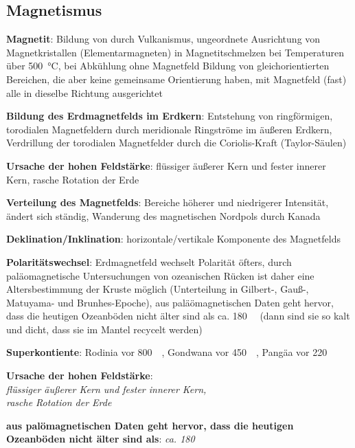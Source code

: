 \subsection{%
    Magnetismus%
}

\textbf{Magnetit}:
Bildung von  durch Vulkanismus,
ungeordnete Ausrichtung von Magnetkristallen (Elementarmagneten) in Magnetitschmelzen bei
Temperaturen über \SI{500}{\celsius},
bei Abkühlung ohne Magnetfeld Bildung von gleichorientierten Bereichen, die aber keine
gemeinsame Orientierung haben,
mit Magnetfeld (fast) alle in dieselbe Richtung ausgerichtet

\textbf{Bildung des Erdmagnetfelds im Erdkern}:
Entstehung von ringförmigen, torodialen Magnetfeldern durch meridionale Ringströme im
äußeren Erdkern,
Verdrillung der torodialen Magnetfelder durch die Coriolis-Kraft (Taylor-Säulen)

\textbf{Ursache der hohen Feldstärke}:
flüssiger äußerer Kern und fester innerer Kern,
rasche Rotation der Erde

\textbf{Verteilung des Magnetfelds}:
Bereiche höherer und niedrigerer Intensität,
ändert sich ständig,
Wanderung des magnetischen Nordpols durch Kanada

\textbf{Deklination/Inklination}:
horizontale/vertikale Komponente des Magnetfelds

\textbf{Polaritätswechsel}:
Erdmagnetfeld wechselt Polarität öfters,
durch paläomagnetische Untersuchungen von ozeanischen Rücken ist daher eine
Altersbestimmung der Kruste möglich
(Unterteilung in Gilbert-, Gauß-, Matuyama- und Brunhes-Epoche),
aus paläömagnetischen Daten geht hervor, dass die heutigen Ozeanböden nicht älter sind als
ca. \SI{180}{\mega\year}
(dann sind sie so kalt und dicht, dass sie im Mantel recycelt werden)

\textbf{Superkontiente}:
Rodinia vor \SI{800}{\mega\year},
Gondwana vor \SI{450}{\mega\year},
Pangäa vor \SI{220}{\mega\year}

\begin{wichtig}
    \item
    \textbf{Ursache der hohen Feldstärke}:\\
    \emph{flüssiger äußerer Kern und fester innerer Kern,\\
    rasche Rotation der Erde}
    
    \item
    \textbf{aus palömagnetischen Daten geht hervor, dass die heutigen Ozeanböden nicht
    älter sind als}:
    \emph{ca. \SI[math-rm=\mathit,text-rm=\itshape]{180}{\mega\year}}
\end{wichtig}

